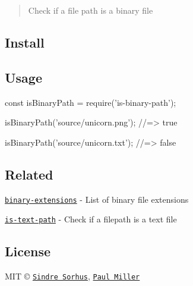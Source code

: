 \begin{quote}
Check if a file path is a binary file \end{quote}


\subsection*{Install}




\subsection*{Usage}


\begin{DoxyCode}
const isBinaryPath = require('is-binary-path');

isBinaryPath('source/unicorn.png');
//=> true

isBinaryPath('source/unicorn.txt');
//=> false
\end{DoxyCode}


\subsection*{Related}


\begin{DoxyItemize}
\item \href{https://github.com/sindresorhus/binary-extensions}{\tt binary-\/extensions} -\/ List of binary file extensions
\item \href{https://github.com/sindresorhus/is-text-path}{\tt is-\/text-\/path} -\/ Check if a filepath is a text file
\end{DoxyItemize}

\subsection*{License}

M\+IT © \href{https://sindresorhus.com}{\tt Sindre Sorhus}, \href{https://paulmillr.com}{\tt Paul Miller} 